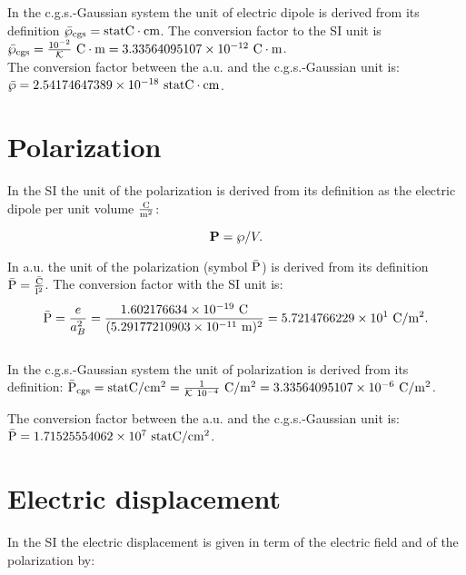\documentclass[12pt,a4paper,twoside]{report}
\def\barl{5.29177210903\times 10^{-11}}
\def\barc{1.602176634\times 10^{-19}}
\def\barpolar{5.7214766229\times 10^{1}}
\def\diptodip{3.33564095107\times 10^{-12}}
\def\polartopolar{3.33564095107\times 10^{-6}}
\def\bardipcgs{2.54174647389\times 10^{-18}}
\def\barpolarcgs{1.71525554062\times 10^{7}}
\begin{document}
{{\color{orange} In the c.g.s.-Gaussian system the unit of electric 
dipole is derived from its definition ${\rm \bar \wp_{cgs}}={\rm statC}\cdot {\rm cm}$.
The conversion factor to the SI unit is ${\rm \bar \wp_{cgs}}={10^{-2} \over 
\mathcal{K}}
\ {\rm C}\cdot {\rm m}=\diptodip\ {\rm C}\cdot {\rm m}$.
}
\\

{\color{green} 
The conversion factor between the a.u. and the c.g.s.-Gaussian unit is: 
${\rm \bar \wp} = \bardipcgs \ {\rm statC}\cdot {\rm cm}$.
}

\newpage
{\color{coral}\section{Polarization}}
\color{black}
In the SI the unit of the polarization is derived from its definition as
the electric dipole per unit volume ${{\rm C} \over {\rm m}^2}$: 

\begin{tcolorbox}
\begin{equation}
{\bf P}= {\bf \wp} / V.
\end{equation}
\end{tcolorbox}

{\color{web-blue} In a.u. the unit of the polarization (symbol ${\rm \bar P}$) 
is derived from its definition ${\rm \bar P}={{\rm \bar C} \over {\rm \bar l}^2}$. The 
conversion factor with the SI unit is:
\begin{equation}
{\rm \bar P} = {e \over a_B^2} =
{\barc\ {\rm C} \over (\barl\ {\rm m})^2} = \barpolar\ {\rm C}/{\rm m}^2.
\end{equation}
}
\\

{\color{orange} In the c.g.s.-Gaussian system the unit of polarization
is derived from its definition:
${\rm \bar P_{cgs}}={\rm statC}/{\rm cm}^2 = {1\over \mathcal{K}\ 10^{-4}}\ {\rm C}/{\rm m}^2=\polartopolar\ {\rm C}/{\rm m}^2$. 
\\
}

{\color{green} 
The conversion factor between the a.u. and the c.g.s.-Gaussian unit is: 
${\rm \bar P} = \barpolarcgs \ {\rm statC}/{\rm cm}^2$.
}

\newpage
{\color{coral}\section{Electric displacement}}
\color{black}
In the SI the electric displacement is given in term of the
electric field and of the polarization by:

}
\end{document}
